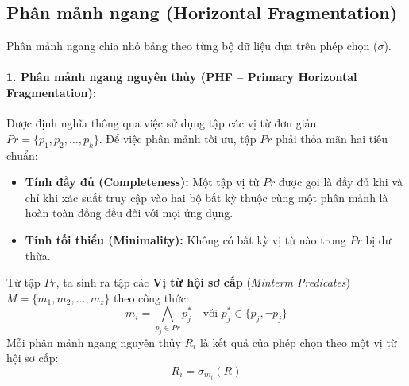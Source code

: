 \documentclass[12pt,a4paper]{report}
\begin{document}
\subsection[Phân mảnh ngang (Primary và Derived)]{Phân mảnh ngang (Horizontal Fragmentation)}
Phân mảnh ngang chia nhỏ bảng theo từng bộ dữ liệu dựa trên phép chọn ($\sigma$).

\paragraph{1. Phân mảnh ngang nguyên thủy (PHF -- Primary Horizontal Fragmentation):}
Được định nghĩa thông qua việc sử dụng tập các vị từ đơn giản $Pr = \{p_1, p_2, \dots, p_k\}$. Để việc phân mảnh tối ưu, tập $Pr$ phải thỏa mãn hai tiêu chuẩn:
\begin{itemize}
    \item \textbf{Tính đầy đủ (Completeness):} Một tập vị từ $Pr$ được gọi là đầy đủ khi và chỉ khi xác suất truy cập vào hai bộ bất kỳ thuộc cùng một phân mảnh là hoàn toàn đồng đều đối với mọi ứng dụng.
    \item \textbf{Tính tối thiểu (Minimality):} Không có bất kỳ vị từ nào trong $Pr$ bị dư thừa.
\end{itemize}
Từ tập $Pr$, ta sinh ra tập các \textbf{Vị từ hội sơ cấp} (\textit{Minterm Predicates}) $M = \{m_1, m_2, \dots, m_z\}$ theo công thức:
\[
    m_i = \bigwedge_{p_j \in Pr} p_j^* \quad \text{với } p_j^* \in \{p_j, \neg p_j\}
\]
Mỗi phân mảnh ngang nguyên thủy $R_i$ là kết quả của phép chọn theo một vị từ hội sơ cấp:
\[
    R_i = \sigma_{m_i}(R)
\]
\end{document}

